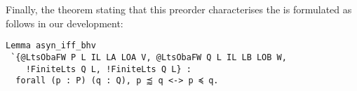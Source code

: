 Finally, the theorem stating that this preorder characterises the \mustpreorder
is formulated as follows in our development:

\begin{mdframed}
  \begin{verbatim}
Lemma asyn_iff_bhv
 `{@LtsObaFW P L IL LA LOA V, @LtsObaFW Q L IL LB LOB W, 
    !FiniteLts Q L, !FiniteLts Q L} : 
  forall (p : P) (q : Q), p ⪷ q <-> p ≼ q.
  \end{verbatim}
\end{mdframed}

\clearpage
